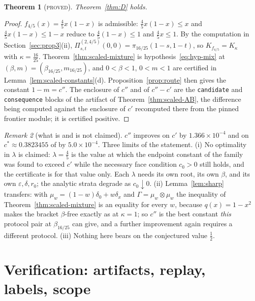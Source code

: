 \documentclass[11pt]{article}
\theoremstyle{plain}
\newtheorem{theorem}{Theorem}[section]
\theoremstyle{definition}
\theoremstyle{remark}
\newtheorem{remark}[theorem]{Remark}
\newcommand{\lbl}[1]{\textsc{#1}}
\begin{document}
\begin{theorem}[\lbl{proved}]\label{thm:uc45}
Theorem~\ref{thm:D} holds.
\end{theorem}
\begin{proof}
$f_{4/5}(x)=\tfrac45x(1-x)$ is admissible: $\tfrac45x(1-x)\le x$ and
$\tfrac45x(1-x)\le1-x$ reduce to $\tfrac45(1-x)\le1$ and $\tfrac45x\le1$.  By
the computation in Section~\ref{sec:prop3}(ii),
$\Pi^{(2,4/5)}_{s,t}(0,0)=\pi_{16/25}(1-s,1-t)$, so $K_{f_{4/5}}=K_\kappa$
with $\kappa=\tfrac{16}{25}$.  Theorem~\ref{thm:scaled-mixture} is
hypothesis~\eqref{eq:hyp-mix} at $(\beta,m)=(\beta_{16/25},m_{16/25})$, and
$0<\beta<1$, $0<m<1$ are certified in
Lemma~\ref{lem:scaled-constants}(d).  Proposition~\ref{prop:route} then gives
the constant $1-m=c''$.  The enclosure of $c''$ and of $c''-c'$ are the
\texttt{candidate} and \texttt{consequence} blocks of the artifact of
Theorem~\ref{thm:scaled-AB}, the difference being computed against the
enclosure of $c'$ recomputed there from the pinned frontier module; it is
certified positive.
\end{proof}

\begin{remark}[what is and is not claimed]\label{rem:scaled-scope}
$c''$ improves on $c'$ by $1.366\times10^{-4}$ and on
$c^\ast\approx0.3823455$ of \cite{Yu23,Cam22} by $5.0\times10^{-4}$.  Three
limits of the statement.  (i) No optimality in $\lambda$ is claimed:
$\lambda=\tfrac45$ is the value at which the endpoint constant of the family
was found to exceed $c'$ while the necessary face condition $c_0>0$ still
holds, and the certificate is for that value only.  Each $\lambda$ needs its
own root, its own $\beta$, and its own $\varepsilon,\delta,r_0$; the analytic
strata degrade as $c_0\downarrow0$.  (ii) Lemma~\ref{lem:sharp} transfers:
with $\mu_w=(1-w)\delta_0+w\delta_{x}$ and $\Gamma=\mu_w\otimes\mu_w$ the
inequality of Theorem~\ref{thm:scaled-mixture} is an equality for every $w$,
because $q(x)=1-x^2$ makes the bracket $\beta$-free exactly as at
$\kappa=1$; so $c''$ is the best constant \emph{this} protocol pair at
$\beta_{16/25}$ can give, and a further improvement again requires a
different protocol.  (iii) Nothing here bears on the conjectured value
$\tfrac12$.
\end{remark}

\section{Verification: artifacts, replay, labels, scope}\label{sec:verification}
\end{document}
